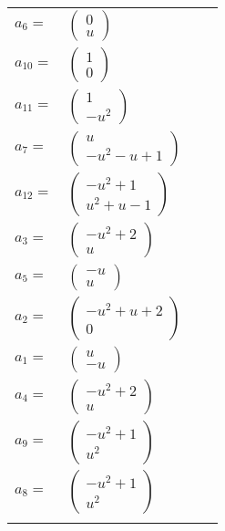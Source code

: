 \documentclass[1p]{elsarticle_modified}
\theoremstyle{definition}
\begin{document}
\begin{tabular}{m{7pt} m{180pt} m{7pt} m{180pt} }
\flushright $a_{6}=$&$\begin{pmatrix}0\\u\end{pmatrix}$ \\
\flushright $a_{10}=$&$\begin{pmatrix}1\\0\end{pmatrix}$ \\
\flushright $a_{11}=$&$\begin{pmatrix}1\\- u^2\end{pmatrix}$ \\
\flushright $a_{7}=$&$\begin{pmatrix}u\\- u^2- u+1\end{pmatrix}$ \\
\flushright $a_{12}=$&$\begin{pmatrix}- u^2+1\\u^2+u-1\end{pmatrix}$ \\
\flushright $a_{3}=$&$\begin{pmatrix}- u^2+2\\u\end{pmatrix}$ \\
\flushright $a_{5}=$&$\begin{pmatrix}- u\\u\end{pmatrix}$ \\
\flushright $a_{2}=$&$\begin{pmatrix}- u^2+u+2\\0\end{pmatrix}$ \\
\flushright $a_{1}=$&$\begin{pmatrix}u\\- u\end{pmatrix}$ \\
\flushright $a_{4}=$&$\begin{pmatrix}- u^2+2\\u\end{pmatrix}$ \\
\flushright $a_{9}=$&$\begin{pmatrix}- u^2+1\\u^2\end{pmatrix}$ \\
\flushright $a_{8}=$&$\begin{pmatrix}- u^2+1\\u^2\end{pmatrix}$\\&\end{tabular}
\end{document}
